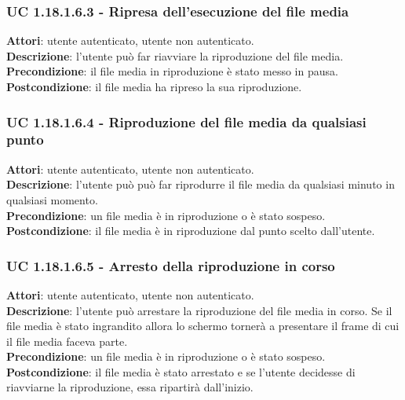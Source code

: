 	\subsubsection{UC 1.18.1.6.3 - Ripresa dell'esecuzione del file media}{
		\label{uc1.18.1.6.3}
		\textbf{Attori}: utente autenticato, utente non autenticato. \\
		\textbf{Descrizione}: l'utente può far riavviare la riproduzione del file media. \\
		\textbf{Precondizione}: il file media in riproduzione è stato messo in pausa.	\\
		\textbf{Postcondizione}: il file media ha ripreso la sua riproduzione.
	}
	\subsubsection{UC 1.18.1.6.4 - Riproduzione del file media da qualsiasi punto}{
		\label{uc1.18.1.6.4}
		\textbf{Attori}: utente autenticato, utente non autenticato. \\
		\textbf{Descrizione}: l'utente può può far riprodurre il file media da qualsiasi minuto in qualsiasi momento. \\
		\textbf{Precondizione}: un file media è in riproduzione o è stato sospeso.	\\
		\textbf{Postcondizione}: il file media è in riproduzione dal punto scelto dall'utente.
	}
	\subsubsection{UC 1.18.1.6.5 - Arresto della riproduzione in corso}{
		\label{uc1.18.1.6.5}
		\textbf{Attori}: utente autenticato, utente non autenticato. \\
		\textbf{Descrizione}: l'utente può arrestare la riproduzione del file media in corso. Se il file media è stato ingrandito allora lo schermo tornerà a presentare il frame di cui il file media faceva parte. \\
		\textbf{Precondizione}: un file media è in riproduzione o è stato sospeso.	\\
		\textbf{Postcondizione}: il file media è stato arrestato e se l'utente decidesse di riavviarne la riproduzione, essa ripartirà dall'inizio.
	}
